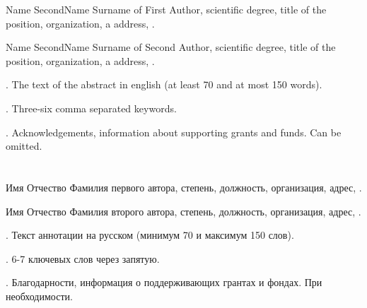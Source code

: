 \begin{abstr}
	Name SecondName Surname of First Author, scientific degree, title of the position, organization, a address, %
	. 
	\par 
	Name SecondName Surname of Second Author, scientific degree,  title of the position, organization, a address, %
	. 
	\par
	{\normalfont \abstractnameENG.} The text of the abstract in english (at least 70 and at most 150 words).
	\par
	{\normalfont \keywordsENG.} Three-six comma separated keywords.
	\par
	{\normalfont \acknowledgementsENG.} Acknowledgements, information about supporting grants and funds. Can be omitted. 
	\delnewpagebeforech %


	\chapter*{\normalsize \chapterRuTitle} %
	
	Имя Отчество Фамилия первого автора, степень, должность, организация, адрес, . %
	\par
	Имя Отчество Фамилия второго автора, степень, должность, организация, адрес, . %
	\par
	{\normalfont \abstractname.} Текст аннотации на русском (минимум 70 и максимум 150 слов).   
	\par
	{\normalfont \keywords.} 6-7 ключевых слов через запятую.
	\par
	{\normalfont \acknowledgements.} Благодарности, информация о поддерживающих грантах и фондах. При необходимости. 


\end{abstr}

